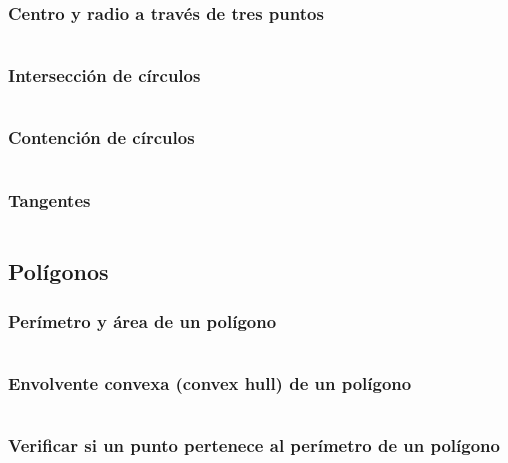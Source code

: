 \documentclass[11pt]{article}
\begin{document}
			\subsubsection{Centro y radio a través de tres puntos}
			\inputminted[tabsize=2,breaklines,firstline=424,lastline=429,fontsize=\small]{c++}{geometry.cpp}
			
			\subsubsection{Intersección de círculos}
			\inputminted[tabsize=2,breaklines,firstline=431,lastline=448,fontsize=\small]{c++}{geometry.cpp}
			
			\subsubsection{Contención de círculos}
			\inputminted[tabsize=2,breaklines,firstline=450,lastline=469,fontsize=\small]{c++}{geometry.cpp}
			
			\subsubsection{Tangentes}
			\inputminted[tabsize=2,breaklines,firstline=471,lastline=501,fontsize=\small]{c++}{geometry.cpp}
		
		\subsection{Polígonos}
			\subsubsection{Perímetro y área de un polígono}
			\inputminted[tabsize=2,breaklines,firstline=174,lastline=190,fontsize=\small]{c++}{geometry.cpp}
			
			\subsubsection{Envolvente convexa (convex hull) de un polígono}
			\inputminted[tabsize=2,breaklines,firstline=192,lastline=211,fontsize=\small]{c++}{geometry.cpp}
			
			\subsubsection{Verificar si un punto pertenece al perímetro de un polígono}
			\inputminted[tabsize=2,breaklines,firstline=213,lastline=221,fontsize=\small]{c++}{geometry.cpp}
			
\end{document}

